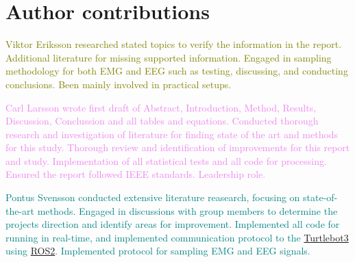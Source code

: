 \section*{Author contributions}

\textcolor{olive}{Viktor Eriksson researched stated topics to verify the information in the report. Additional literature for missing supported information.
Engaged in sampling methodology for both EMG and EEG such as testing, discussing, and conducting conclusions. Been mainly involved in practical setups.}

\textcolor{violet}{Carl Larsson wrote first draft of Abstract, Introduction, Method, Results, Discussion, Conclussion and all tables and equations. Conducted thorough research and investigation of literature for finding state of the art and methods for this study. Thorough review and identification of improvements for this report and study. Implementation of all statistical tests and all code for processing. Ensured the report followed IEEE standards. Leadership role.}

\textcolor{teal}{Pontus Svensson conducted extensive literature reasearch, focusing on state-of-the-art methods. Engaged in discussions with group members to determine the projects direction and identify areas for improvement. Implemented all code for running in real-time, and implemented communication protocol to the \href{https://github.com/ROBOTIS-GIT/turtlebot3}{Turtlebot3} using \href{https://docs.ros.org/en/humble/index.html}{ROS2}. Implemented protocol for sampling EMG and EEG signals.}



\begin{comment}
    all text in the report should be color-coded for each author.
\end{comment}
